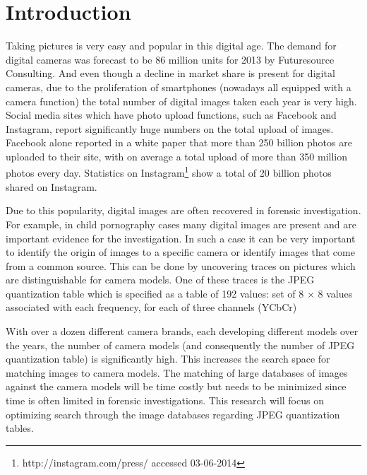 \documentclass[a4paper,8pt]{article}
\begin{document}
\maketitle

\section*{Introduction}
Taking pictures is very easy and popular in this digital age. The demand for digital cameras was forecast to be 86 million units for 2013 by Futuresource Consulting\cite{futuresource}. And even though a decline in market share is present for digital cameras, due to the  proliferation of smartphones (nowadays all equipped with a camera function) the total number of digital images taken each year is very high. Social media sites which have photo upload functions, such as Facebook and Instagram, report significantly huge numbers on the total upload of images. Facebook alone reported in a white paper \cite{whitefacebook} that more than 250 billion photos are uploaded to their site, with on average a total upload of more than 350 million photos every day. Statistics on Instagram\footnote{http://instagram.com/press/ accessed 03-06-2014} show a total of 20 billion photos shared on Instagram.

Due to this popularity, digital images are often recovered in forensic investigation. For example, in child pornography cases many digital images are present and are important evidence for the investigation. In such a case it can be very important to identify the origin of images to a specific camera or identify images that come from a common source. This can be done by uncovering traces on pictures which are distinguishable for camera models. One of these traces is the JPEG quantization table which is specified as a table of 192 values: set of 8 $\times$ 8 values associated with each frequency, for each of three channels (YCbCr)

With over a dozen different camera brands, each developing different models over the years, the number of camera models (and consequently the number of JPEG quantization table) is significantly high. This increases the search space for matching images to camera models. The matching of large databases of images against the camera models will be time costly but needs to be minimized since time is often limited in forensic investigations. This research will focus on optimizing search through the image databases regarding JPEG quantization tables.
\end{document}
